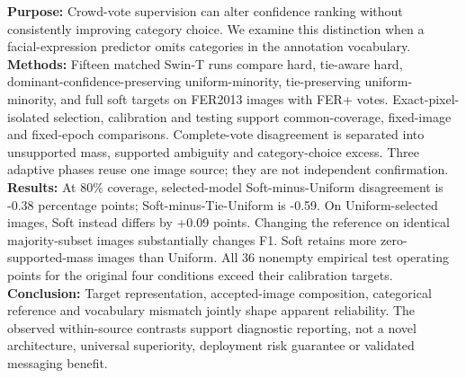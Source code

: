 \textbf{Purpose:} Crowd-vote supervision can alter confidence ranking without consistently improving category choice. We examine this distinction when a facial-expression predictor omits categories in the annotation vocabulary.
\textbf{Methods:} Fifteen matched Swin-T runs compare hard, tie-aware hard, dominant-confidence-preserving uniform-minority, tie-preserving uniform-minority, and full soft targets on FER2013 images with FER+ votes. Exact-pixel-isolated selection, calibration and testing support common-coverage, fixed-image and fixed-epoch comparisons. Complete-vote disagreement is separated into unsupported mass, supported ambiguity and category-choice excess. Three adaptive phases reuse one image source; they are not independent confirmation.
\textbf{Results:} At 80\% coverage, selected-model Soft-minus-Uniform disagreement is -0.38 percentage points; Soft-minus-Tie-Uniform is -0.59. On Uniform-selected images, Soft instead differs by +0.09 points. Changing the reference on identical majority-subset images substantially changes F1. Soft retains more zero-supported-mass images than Uniform. All 36 nonempty empirical test operating points for the original four conditions exceed their calibration targets.
\textbf{Conclusion:} Target representation, accepted-image composition, categorical reference and vocabulary mismatch jointly shape apparent reliability. The observed within-source contrasts support diagnostic reporting, not a novel architecture, universal superiority, deployment risk guarantee or validated messaging benefit.